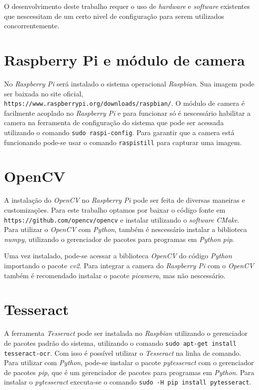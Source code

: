 O desenvolvimento deste trabalho requer o uso de \emph{hardware} e \emph{software} existentes
que nescessitam de um certo nivel de configuração para serem utilizados concorrentemente.

\section{Raspberry Pi e módulo de camera}
\label{sec:confrpi}

No \emph{Raspberry Pi} será instalado o sistema operacional \emph{Raspbian}. Sua imagem pode ser baixada no
site oficial, \texttt{https://www.raspberrypi.org/downloads/raspbian/}. O módulo de camera é facilmente acoplado no
\emph{Raspberry Pi} e para funcionar só é nescessário habilitar a camera na ferramenta de configuração do sistema que pode
ser acessada utilizando o comando \texttt{sudo raspi-config}. Para garantir que a camera está funcionando pode-se usar o
comando \texttt{raspistill} para capturar uma imagem.

\section{OpenCV}
\label{sec:confopencv}

A instalação do \emph{OpenCV} no \emph{Raspberry Pi} pode ser feita de diversas maneiras e customizações.
Para este trabalho optamos por baixar o código fonte em \texttt{https://github.com/opencv/opencv} e instalar
utilizando o \emph{software} \emph{CMake}. Para utilizar o \emph{OpenCV} com \emph{Python}, também é nescessário
instalar a biblioteca \emph{numpy}, utilizando o gerenciador de pacotes para programas em \emph{Python} \emph{pip}.

Uma vez instalado, pode-se acessar a biblioteca \emph{OpenCV} do código \emph{Python} importando o pacote \emph{cv2}.
Para integrar a camera do \emph{Raspberry Pi} com o \emph{OpenCV} também é recomendado instalar o pacote \emph{picamera},
mas não nescessário.

\section{Tesseract}
\label{sec:conftess}

A ferramenta \emph{Tesseract} pode ser instalada no \emph{Raspbian} utilizando o gerenciador de pacotes padrão do sistema,
utilizando o comando \texttt{sudo apt-get install tesseract-ocr}. Com isso é possível utilizar o \emph{Tesseract} na linha
de comando. Para utilizar com \emph{Python}, pode-se instalar o pacote \emph{pytesseract} com o gerenciador de pacotes \emph{pip},
que é um gerenciador de pacotes para programas em \emph{Python}. Para instalar o \emph{pytesseract} executa-se o comando
\texttt{sudo -H pip install pytesseract}.
